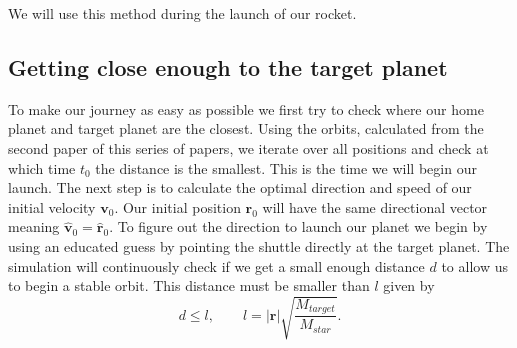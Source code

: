 \documentclass[reprint,english,notitlepage]{revtex4-2}
\begin{document}
We will use this method during the launch of our rocket.

\subsection{Getting close enough to the target planet} \label{subsec:getting-close-enough}
To make our journey as easy as possible we first try to check where our home planet and target planet are the closest.
Using the orbits, calculated from the second paper %
of this series of papers, we iterate over all positions and check at which time $ t_{0} $ the distance is the smallest.
This is the time we will begin our launch.
The next step is to calculate the optimal direction and speed of our initial velocity $ \mathbf{v}_0 $.
Our initial position $ \mathbf{r}_0 $ will have the same directional vector meaning $ \hat{\mathbf{v}}_0 = \hat{\mathbf{r}}_0  $.
To figure out the direction to launch our planet we begin by using an educated guess by pointing the shuttle directly at the target planet.
The simulation will continuously check if we get a small enough distance $ d $ to allow us to begin a stable orbit.
This distance must be smaller than $ l $ given by
\[
d \le l, \qquad l = \left\vert \mathbf{r} \right\vert \sqrt{\frac{M_{target}}{M_{star}}}.
\]
\end{document}
